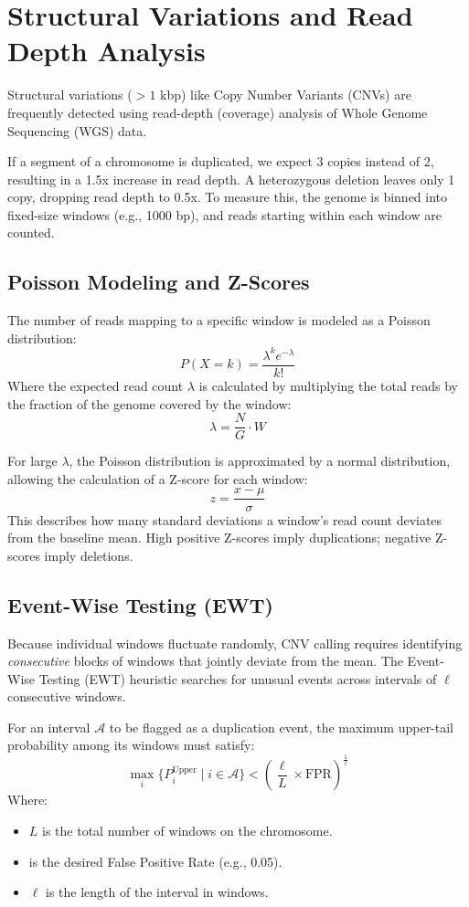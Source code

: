 \documentclass[11pt,a4paper]{article}
\begin{document}
\section{Structural Variations and Read Depth Analysis}
Structural variations (\(>1\) kbp) like Copy Number Variants (CNVs) are frequently detected using read-depth (coverage) analysis of Whole Genome Sequencing (WGS) data. 


If a segment of a chromosome is duplicated, we expect 3 copies instead of 2, resulting in a 1.5x increase in read depth. A heterozygous deletion leaves only 1 copy, dropping read depth to 0.5x. To measure this, the genome is binned into fixed-size windows (e.g., 1000 bp), and reads starting within each window are counted.

\subsection{Poisson Modeling and Z-Scores}
The number of reads mapping to a specific window is modeled as a Poisson distribution:
\[ P(X = k) = \frac{\lambda^k e^{-\lambda}}{k!} \]
Where the expected read count \(\lambda\) is calculated by multiplying the total reads by the fraction of the genome covered by the window:
\[ \lambda = \frac{N}{G} \cdot W \]

For large \(\lambda\), the Poisson distribution is approximated by a normal distribution, allowing the calculation of a Z-score for each window:
\[ z = \frac{x - \mu}{\sigma} \]
This describes how many standard deviations a window's read count deviates from the baseline mean. High positive Z-scores imply duplications; negative Z-scores imply deletions.

\subsection{Event-Wise Testing (EWT)}
Because individual windows fluctuate randomly, CNV calling requires identifying \textit{consecutive} blocks of windows that jointly deviate from the mean. The Event-Wise Testing (EWT) heuristic searches for unusual events across intervals of \(\ell\) consecutive windows.

For an interval \(\mathcal{A}\) to be flagged as a duplication event, the maximum upper-tail probability among its windows must satisfy:
\[ \max_i \{ P_i^{\text{Upper}} \mid i \in \mathcal{A} \} < \left( \frac{\ell}{L} \times \text{FPR} \right)^{\frac{1}{\ell}} \]
Where:
\begin{itemize}
    \item \( L \) is the total number of windows on the chromosome.
    \item {} is the desired False Positive Rate (e.g., 0.05).
    \item \(\ell\) is the length of the interval in windows.
\end{itemize}
\end{document}
